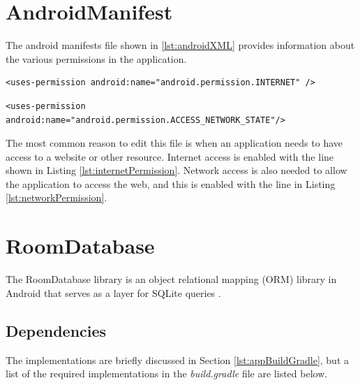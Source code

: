 \documentclass[12pt]{article}
\begin{document}
\newpage
\section{AndroidManifest}

The android manifests file shown in \ref{lst:androidXML} provides information about the various permissions in the application. 

\begin{lstlisting}[numbers=none, 
			caption=Line to give permission to allow internet access,
			label={lst:internetPermission}]
<uses-permission android:name="android.permission.INTERNET" />
\end{lstlisting}

\begin{lstlisting}[numbers=none, 
			caption=Line to give permission to allow network access,
			label={lst:networkPermission}]
<uses-permission android:name="android.permission.ACCESS_NETWORK_STATE"/>
\end{lstlisting}
The most common reason to edit this file is when an application needs to have access to a website or other resource. Internet access is enabled with the line shown in Listing \ref{lst:internetPermission}.
Network access is also needed to allow the application to access the web, and this is enabled with the line in Listing \ref{lst:networkPermission}.


\newpage

\section{RoomDatabase}
The RoomDatabase library is an object relational mapping (ORM) library in Android that serves as a layer for SQLite queries \cite{GoogleRoomDB} .
\subsection{Dependencies}
The implementations are briefly discussed in Section \ref{lst:appBuildGradle}, but a list of the required implementations in the \textit{build.gradle} file are listed below. 
\end{document}
